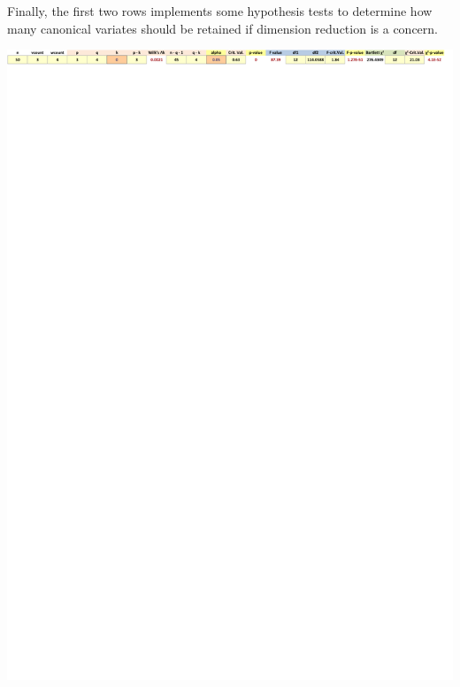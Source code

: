 \documentclass[article]{jss}
\begin{document}
        Finally, the first two rows implements some hypothesis tests to determine how many canonical variates should be retained if dimension reduction is a concern.
        \begin{center}
          \includegraphics[width=\linewidth, keepaspectratio=true]{img/CanCorrSheetHypothesisTests}
        \end{center}
        
        
        
        
        
\end{document}
